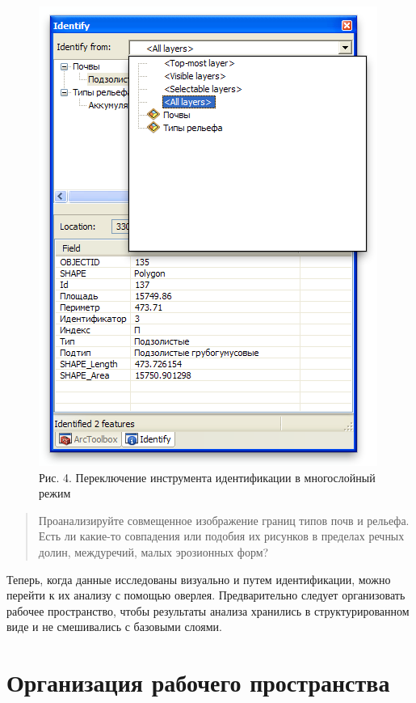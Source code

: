 \documentclass[12pt,]{book}
\begin{document}
\begin{enumerate}
  \begin{figure}
  \centering
  \includegraphics{images/Ex10/image7.png}
  \caption{Рис. 4. Переключение инструмента идентификации в многослойный режим}
  \end{figure}
\end{enumerate}

\begin{quote}
Проанализируйте совмещенное изображение границ типов почв и рельефа. Есть ли какие-то совпадения или подобия их рисунков в пределах речных долин, междуречий, малых эрозионных форм?
\end{quote}

Теперь, когда данные исследованы визуально и путем идентификации, можно перейти к их анализу с помощью оверлея. Предварительно следует организовать рабочее пространство, чтобы результаты анализа хранились в структурированном виде и не смешивались с базовыми слоями.

\hypertarget{overlay-workspace}{%
\section{Организация рабочего пространства}\label{overlay-workspace}}
\end{document}
